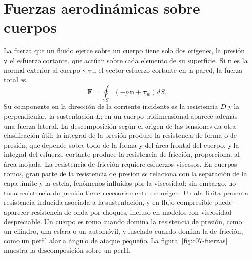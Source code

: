 \documentclass[10pt,openany]{book}
\begin{document}
\section{Fuerzas aerodinámicas sobre cuerpos}

La fuerza que un fluido ejerce sobre un cuerpo tiene solo dos orígenes, la presión y el esfuerzo cortante, que actúan sobre cada elemento de su superficie. Si \(\mathbf{n}\) es la normal exterior al cuerpo y \(\boldsymbol{\tau}_w\) el vector esfuerzo cortante en la pared, la fuerza total es
\begin{equation}
\mathbf{F} = \oint_S \left(-p\,\mathbf{n} + \boldsymbol{\tau}_w\right) dS. \label{eq:c07-fuerza}
\end{equation}
Su componente en la dirección de la corriente incidente es la resistencia \(D\) y la perpendicular, la sustentación \(L\); en un cuerpo tridimensional aparece además una fuerza lateral. La descomposición según el origen de las tensiones da otra clasificación útil: la integral de la presión produce la resistencia de forma o de presión, que depende sobre todo de la forma y del área frontal del cuerpo, y la integral del esfuerzo cortante produce la resistencia de fricción, proporcional al área mojada. La resistencia de fricción requiere esfuerzos viscosos. En cuerpos romos, gran parte de la resistencia de presión se relaciona con la separación de la capa límite y la estela, fenómenos influidos por la viscosidad; sin embargo, no toda resistencia de presión tiene necesariamente ese origen. Un ala finita presenta resistencia inducida asociada a la sustentación, y en flujo compresible puede aparecer resistencia de onda por choques, incluso en modelos con viscosidad despreciable. Un cuerpo es romo cuando domina la resistencia de presión, como un cilindro, una esfera o un automóvil, y fuselado cuando domina la de fricción, como un perfil alar a ángulo de ataque pequeño. La figura~\ref{fig:c07-fuerzas} muestra la descomposición sobre un perfil.
\end{document}
